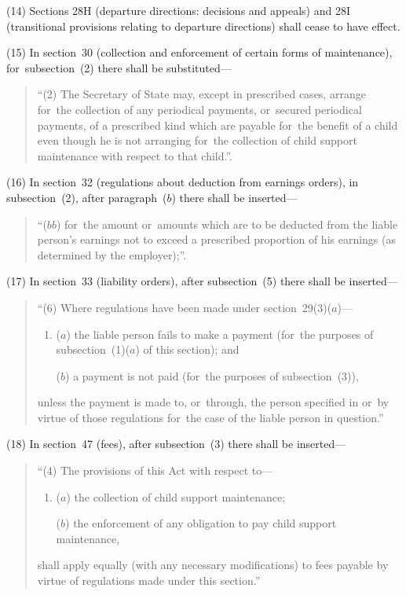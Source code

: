 \documentclass[12pt,a4paper]{article}
\begin{document}
(14) Sections 28H (departure directions: decisions and appeals) and 28I (transitional provisions relating to departure directions) shall cease to have effect.

(15) In section~30 (collection and enforcement of certain forms of maintenance), for~subsection~(2)  there shall be substituted—
\begin{quotation}
“(2) The Secretary of State may, except in prescribed cases, arrange for~the collection of any periodical payments, or~secured periodical payments, of a prescribed kind which are payable for~the benefit of a child even though he is not arranging for~the collection of child support maintenance with respect to that child.”.
\end{quotation}

(16) In section~32 (regulations about deduction from earnings orders), in subsection~(2), after paragraph~($b$)  there shall be inserted—
\begin{quotation}
“($bb$) for~the amount or~amounts which are to be deducted from the liable person’s earnings not to exceed a prescribed proportion of his earnings (as determined by the employer);”.
\end{quotation}

(17) In section~33 (liability orders), after subsection~(5)  there shall be inserted—
\begin{quotation}
\begin{sloppypar}
“(6) Where regulations have been made under section~29(3)($a$)—
\end{sloppypar}
\begin{enumerate}\item[]
($a$) the liable person fails to make a payment (for~the purposes of subsection~(1)($a$)  of this section); and

($b$) a payment is not paid (for~the purposes of subsection~(3)),
\end{enumerate}
unless the payment is made to, or~through, the person specified in or~by virtue of those regulations for~the case of the liable person in question.”
\end{quotation}

(18) In section~47 (fees), after subsection~(3)  there shall be inserted—
\begin{quotation}
“(4) The provisions of this Act with respect to—
\begin{enumerate}\item[]
($a$) the collection of child support maintenance;

($b$) the enforcement of any obligation to pay child support maintenance,
\end{enumerate}
shall apply equally (with any necessary modifications) to fees payable by virtue of regulations made under this section.”
\end{quotation}
\end{document}
